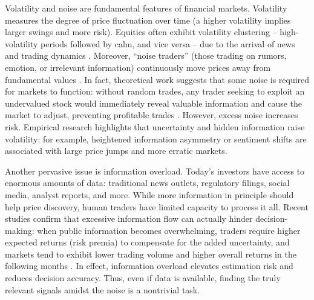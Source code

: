 Volatility and noise are fundamental features of financial markets. Volatility measures the degree of price fluctuation over time (a higher volatility implies larger swings and more risk). Equities often exhibit volatility clustering – high-volatility periods followed by calm, and vice versa – due to the arrival of news and trading dynamics \cite{Robert1982}. Moreover, “noise traders” (those trading on rumors, emotion, or irrelevant information) continuously move prices away from fundamental values \cite{DeLong1990}. In fact, theoretical work suggests that some noise is required for markets to function: without random trades, any trader seeking to exploit an undervalued stock would immediately reveal valuable information and cause the market to adjust, preventing profitable trades \cite{Grossman1980}. However, excess noise increases risk. Empirical research highlights that uncertainty and hidden information raise volatility: for example, heightened information asymmetry or sentiment shifts are associated with large price jumps and more erratic markets.

Another pervasive issue is information overload. Today’s investors have access to enormous amounts of data: traditional news outlets, regulatory filings, social media, analyst reports, and more. While more information in principle should help price discovery, human traders have limited capacity to process it all. Recent studies confirm that excessive information flow can actually hinder decision-making: when public information becomes overwhelming, traders require higher expected returns (risk premia) to compensate for the added uncertainty, and markets tend to exhibit lower trading volume and higher overall returns in the following months \cite{Bernales2023}. In effect, information overload elevates estimation risk and reduces decision accuracy. Thus, even if data is available, finding the truly relevant signals amidst the noise is a nontrivial task.

